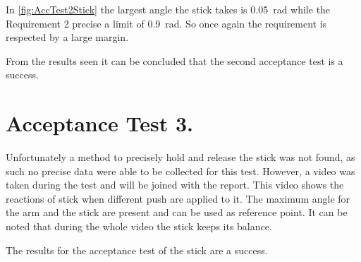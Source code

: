 In \autoref{fig:AccTest2Stick} the largest angle the stick takes is \SI{0.05}{\radian} while the Requirement 2 precise a limit of \SI{0.9}{\radian}. So once again the requirement is respected by a large margin.

From the results seen it can be concluded that the second acceptance test is a success.

\section{Acceptance Test 3.}

Unfortunately a method to precisely hold and release the stick was not found, as such no precise data were able to be collected for this test. However, a video was taken during the test and will be joined with the report. This video shows the reactions of stick when different push are applied to it. The maximum angle for the arm and the stick are present and can be used as reference point. It can be noted that during the whole video the stick keeps its balance.

The results for the acceptance test of the stick are a success.